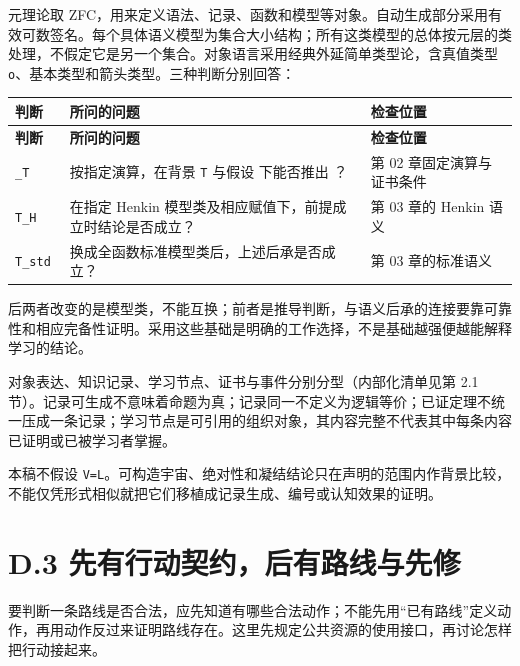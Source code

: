 \documentclass[UTF8,a4paper,zihao=-4,fontset=windows,openany]{ctexbook}
\def\ensuremath#1{#1}%
\newcommand{\mcsbrk}{\penalty 200\relax}
\begin{document}
元理论取 ZFC，用来定义语法、记录、函数和模型等对象。自动生成部分采用有效可数签名。每个具体语义模型为集合大小结构；所有这类模型的总体按元层的类处理，不假定它是另一个集合。对象语言采用经典外延简单类型论，含真值类型 \texttt{o}、基本类型和箭头类型。三种判断分别回答：

\begingroup\small\setlength{\tabcolsep}{4pt}
\begin{longtable}{>{\raggedright\arraybackslash}p{}>{\raggedright\arraybackslash}p{}>{\raggedright\arraybackslash}p{}}
\toprule
\textbf{判断} & \textbf{所问的问题} & \textbf{检查位置} \\
\midrule
\endfirsthead
\toprule
\textbf{判断} & \textbf{所问的问题} & \textbf{检查位置} \\
\midrule
\endhead
\bottomrule
\endfoot
\bottomrule
\endlastfoot
\texttt{\ensuremath{\Gamma}\ensuremath{\vdash}\mcsbrk\_T \ensuremath{\varphi}} & 按指定演算，在背景 \texttt{T} 与假设 \texttt{\ensuremath{\Gamma}} 下能否推出 \texttt{\ensuremath{\varphi}}？ & 第 02 章固定演算与证书条件 \\
\texttt{T\ensuremath{\cup}\ensuremath{\Gamma}\ensuremath{\vDash}\mcsbrk\_H \ensuremath{\varphi}} & 在指定 Henkin 模型类及相应赋值下，前提成立时结论是否成立？ & 第 03 章的 Henkin 语义 \\
\texttt{T\ensuremath{\cup}\ensuremath{\Gamma}\ensuremath{\vDash}\mcsbrk\_std \ensuremath{\varphi}} & 换成全函数标准模型类后，上述后承是否成立？ & 第 03 章的标准语义 \\
\end{longtable}
\endgroup

后两者改变的是模型类，不能互换；前者是推导判断，与语义后承的连接要靠可靠性和相应完备性证明。采用这些基础是明确的工作选择，不是基础越强便越能解释学习的结论。

对象表达、知识记录、学习节点、证书与事件分别分型（内部化清单见第 2.1 节）。记录可生成不意味着命题为真；记录同一不定义为逻辑等价；已证定理不统一压成一条记录；学习节点是可引用的组织对象，其内容完整不代表其中每条内容已证明或已被学习者掌握。

本稿不假设 \texttt{V=L}。可构造宇宙、绝对性和凝结结论只在声明的范围内作背景比较，不能仅凭形式相似就把它们移植成记录生成、编号或认知效果的证明。

\section{D.3 先有行动契约，后有路线与先修}
要判断一条路线是否合法，应先知道有哪些合法动作；不能先用“已有路线”定义动作，再用动作反过来证明路线存在。这里先规定公共资源的使用接口，再讨论怎样把行动接起来。
\end{document}
